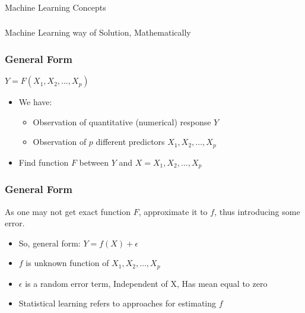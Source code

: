 \begin{frame}[fragile]\frametitle{}
\begin{center}
{\Large Machine Learning Concepts}
\end{center}
\end{frame}

\begin{frame}[fragile]\frametitle{}
\begin{center}
{\Large Machine Learning way of Solution, Mathematically}
\end{center}
\end{frame}


\begin{frame}[fragile]\frametitle{General Form}
$Y= F(X_1, X_2,\ldots, X_p)$
\begin{itemize}
\item We have:
	\begin{itemize}
	\item Observation of quantitative (numerical) response $Y$
	\item Observation of $p$ different predictors ${X_1, X_2, \ldots, X_p}$
	\end{itemize}
	\item Find function $F$ between $Y$ and $X = {X_1, X_2,\ldots, X_p}$
\end{itemize}
\end{frame}

\begin{frame}[fragile]\frametitle{General Form}
As one may not get exact function $F$, approximate it to $f$, thus introducing some error.
\begin{itemize}
\item So, general form: $Y = f(X) + \epsilon$
\item $f$ is unknown function of ${X_1, X_2, \ldots, X_p}$
\item  $\epsilon$ is a random error term, Independent of X, Has mean equal to zero
\item Statistical learning refers to approaches for estimating $f$
\end{itemize}
\end{frame}



